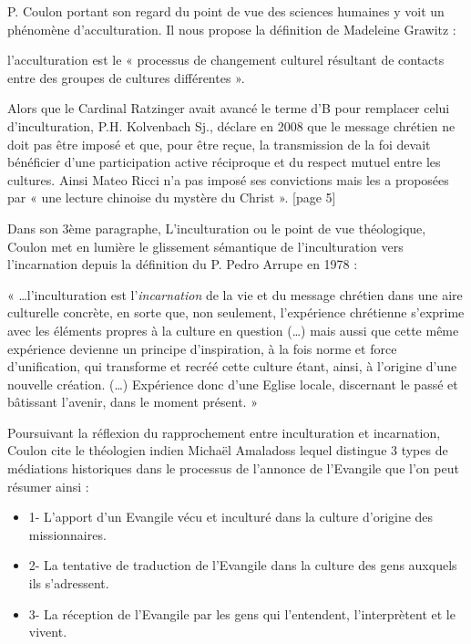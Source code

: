P. Coulon portant son regard du point de vue des sciences humaines y voit un phénomène d’acculturation. Il nous propose la définition de Madeleine Grawitz  :
\begin{Def}[Acculturation]
    l’acculturation est le « processus de changement culturel résultant de contacts entre des groupes de cultures différentes ». 
\end{Def}

Alors que le Cardinal Ratzinger avait avancé le terme d’B pour remplacer celui d’inculturation, P.H. Kolvenbach Sj., déclare en 2008 que le message chrétien ne doit pas être imposé et que, pour être reçue, la transmission de la foi devait bénéficier d’une participation active réciproque et du respect mutuel entre les cultures. Ainsi Mateo Ricci n’a pas imposé ses convictions mais les a proposées par « une lecture chinoise du mystère du Christ ». [page 5]



Dans son 3ème paragraphe, L’inculturation ou le point de vue théologique, Coulon met en lumière le glissement sémantique de l’inculturation vers l’incarnation depuis la définition du P. Pedro Arrupe en 1978 : 
\begin{Def}[inculturation]
    « …l’inculturation est l’\textit{incarnation} de la vie et du message chrétien dans une aire culturelle concrète, en sorte que, non seulement, l’expérience chrétienne s’exprime avec les éléments propres à la culture en question (…) mais aussi que cette même expérience devienne un principe d’inspiration, à la fois norme et force d’unification, qui transforme et recréé cette culture étant, ainsi, à l’origine d’une nouvelle création. (…) Expérience donc d’une Eglise locale, discernant le passé et bâtissant l’avenir, dans le moment présent. »  
\end{Def}

Poursuivant la réflexion du rapprochement entre inculturation et incarnation, Coulon cite le théologien indien Michaël Amaladoss lequel distingue 3 types de médiations historiques dans le processus de l’annonce de l’Evangile que l’on peut résumer ainsi : 

\begin{itemize}
    \item 1-	L’apport d’un Evangile vécu et inculturé dans la culture d’origine des missionnaires.
    \item 2-	La tentative de traduction de l’Evangile dans la culture des gens auxquels ils s’adressent.
    \item 3-	La réception de l’Evangile par les gens qui l’entendent, l’interprètent et le vivent. 
\end{itemize}

